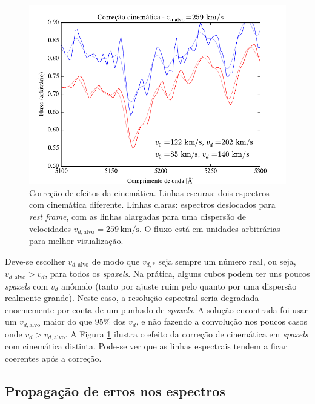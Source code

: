 \begin{figure}
	\includegraphics{figuras/cinematica}
	\caption[Correção de efeitos da cinemática]
	{Correção de efeitos da cinemática. Linhas escuras: dois espectros com
	cinemática diferente. Linhas claras: espectros deslocados para {\em rest
	frame}, com as linhas alargadas para uma dispersão de velocidades
	$v_{d,\mathrm{alvo}} = 259\,\mathrm{km}/\mathrm{s}$. O fluxo está em unidades
	arbitrárias para melhor visualização.}
	\label{fig:cinematica}
\end{figure}

Deve-se escolher $v_{d,\mathrm{alvo}}$ de modo que $v_{d,\ast}$ seja sempre um
número real, ou seja, $v_{d,\mathrm{alvo}} > v_d$, para todos os {\em spaxels}.
Na prática, alguns cubos podem ter uns poucos {\em spaxels} com $v_d$ anômalo
(tanto por ajuste ruim pelo \starlight quanto por uma dispersão realmente
grande). Neste caso, a resolução espectral seria degradada enormemente por conta
de um punhado de {\em spaxels}. A solução encontrada foi usar um
$v_{d,\mathrm{alvo}}$ maior do que $95\%$ dos $v_d$, e não fazendo a convolução
nos poucos casos onde $v_d > v_{d,\mathrm{alvo}}$. A Figura \ref{fig:cinematica}
ilustra o efeito da correção de cinemática em {\em spaxels} com cinemática
distinta. Pode-se ver que as linhas espectrais tendem a ficar coerentes após a
correção.


\subsection{Propagação de erros nos espectros}

